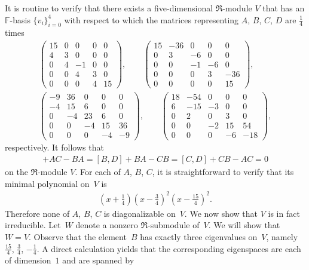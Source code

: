\documentclass[pdftex]{sigma}
\def\F{\mathbb F}
\numberwithin{equation}{section}
\begin{document}
\begin{Example}\label{exam:R}
It is routine to verify that there exists a five-dimensional $\Re$-module $V$ that has an $\F$-basis $\{v_i\}_{i=0}^4$ with respect to which the matrices representing $A$, $B$, $C$, $D$ are $\frac{1}{4}$ times
\begin{gather*}
\begin{pmatrix}
15 &0 &0 &0 &0
\\
4 &3 &0 &0 &0
\\
0 &4 &-1 &0 &0
\\
0 &0 &4 &3 &0
\\
0 &0 &0 &4 &15
\end{pmatrix},
\qquad
\begin{pmatrix}
15 &-36 &0 &0 &0
\\
0 &3 &-6 &0 &0
\\
0 &0 &-1 &-6 &0
\\
0 &0 &0 &3 &-36
\\
0 &0 &0 &0 &15
\end{pmatrix},
\\
\begin{pmatrix}
-9 &36 &0 &0 &0
\\
-4 &15 &6 &0 &0
\\
0 &-4 &23 &6 &0
\\
0 &0 &-4 &15 &36
\\
0 &0 &0 &-4 &-9
\end{pmatrix},
\qquad
\begin{pmatrix}
18 &-54 &0 &0 &0
\\
6 &-15 &-3 &0 &0
\\
0 &2 &0 &3 &0
\\
0 &0 &-2 &15 &54
\\
0 &0 &0 &-6 &-18
\end{pmatrix},
\end{gather*}
respectively. It follows that
\begin{gather*}
[A,D]+AC-BA=[B,D]+BA-CB=[C,D]+CB-AC=0
\end{gather*}
on the $\Re$-module $V$. For each of $A$, $B$, $C$, it is straightforward to verify that its minimal polynomial on~$V$ is
\begin{gather*}
\left(
x+\frac{1}{4}
\right)
\left(
x-\frac{3}{4}
\right)^2
\left(
x-\frac{15}{4}
\right)^2.
\end{gather*}
Therefore none of $A$, $B$, $C$ is diagonalizable on~$V$. We now show that $V$ is in fact irreducible. Let~$W$ denote a nonzero $\Re$-submodule of~$V$. We will show that $W=V$. Observe that the element~$B$ has exactly three eigenvalues on~$V$, namely $\frac{15}{4}$, $\frac{3}{4}$, $-\frac{1}{4}$. A direct calculation yields that the corresponding eigenspaces are each of dimension~$1$ and are spanned by

\end{Example}
\end{document}
